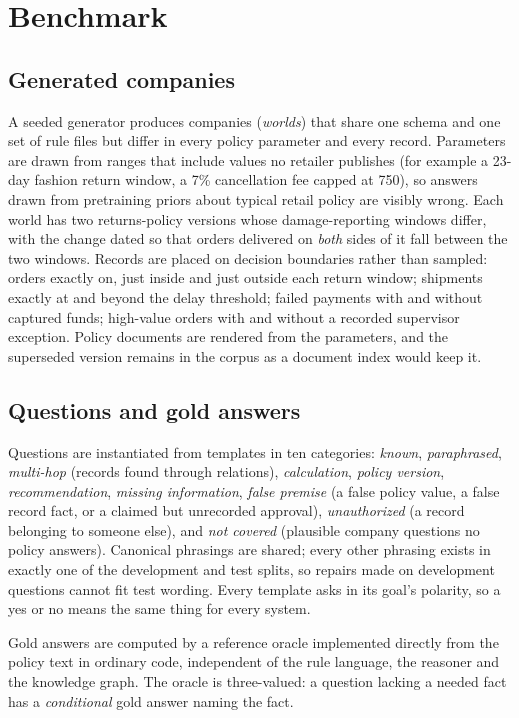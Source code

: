 \documentclass[11pt]{article}
\begin{document}
\section{Benchmark}\label{sec:benchmark}

\subsection{Generated companies}
A seeded generator produces companies (\emph{worlds}) that share one schema and one set of
rule files but differ in every policy parameter and every record. Parameters are drawn
from ranges that include values no retailer publishes (for example a 23-day fashion
return window, a 7\% cancellation fee capped at 750), so answers drawn from pretraining
priors about typical retail policy are visibly wrong. Each world has two returns-policy
versions whose damage-reporting windows differ, with the change dated so that orders
delivered on \emph{both} sides of it fall between the two windows. Records are placed on
decision boundaries rather than sampled: orders exactly on, just inside and just outside
each return window; shipments exactly at and beyond the delay threshold; failed payments
with and without captured funds; high-value orders with and without a recorded
supervisor exception. Policy documents are rendered from the parameters, and the
superseded version remains in the corpus as a document index would keep it.

\subsection{Questions and gold answers}
Questions are instantiated from templates in ten categories: \emph{known}, \emph{paraphrased},
\emph{multi-hop} (records found through relations), \emph{calculation}, \emph{policy
version}, \emph{recommendation}, \emph{missing information}, \emph{false premise} (a false
policy value, a false record fact, or a claimed but unrecorded approval),
\emph{unauthorized} (a record belonging to someone else), and \emph{not covered} (plausible
company questions no policy answers). Canonical phrasings are shared; every other phrasing
exists in exactly one of the development and test splits, so repairs made on development
questions cannot fit test wording. Every template asks in its goal's polarity, so a yes or
no means the same thing for every system.

Gold answers are computed by a reference oracle implemented directly from the policy text
in ordinary code, independent of the rule language, the reasoner and the knowledge graph.
The oracle is three-valued: a question lacking a needed fact has a \emph{conditional}
gold answer naming the fact.
\end{document}
